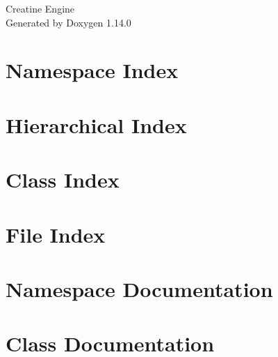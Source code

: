 \documentclass[twoside]{book}
\newcommand{\+}{\discretionary{\mbox{\scriptsize$\hookleftarrow$}}{}{}}
\newcommand{\clearemptydoublepage}{%
    \newpage{\pagestyle{empty}\cleardoublepage}%
  }
\begin{document}
  \raggedbottom
    \hypersetup{pageanchor=false,
                bookmarksnumbered=true,
                pdfencoding=unicode
               }
  \begin{titlepage}
  \vspace*{7cm}
  \begin{center}%
  {\Large Creatine Engine}\\
  \vspace*{1cm}
  {\large Generated by Doxygen 1.14.0}\\
  \end{center}
  \end{titlepage}
  \clearemptydoublepage
  \tableofcontents
  \clearemptydoublepage
  \hypersetup{pageanchor=true}

\chapter{Namespace Index}

\chapter{Hierarchical Index}

\chapter{Class Index}

\chapter{File Index}

\chapter{Namespace Documentation}

\chapter{Class Documentation}


















\end{document}
